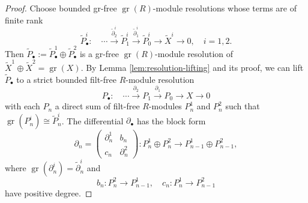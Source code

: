 \documentclass[11pt,a4paper]{article} %
\def\gr{\operatorname{gr}}
\begin{document}
\begin{proof}
Choose bounded gr-free $\gr(R)$-module resolutions whose terms are of finite rank
\[
\widetilde{P}^i_\bullet:
\quad
\cdots\xrightarrow{\widetilde{\partial}^i_2}
\widetilde{P}^i_1
\xrightarrow{\widetilde{\partial}^i_1}
\widetilde{P}^i_0
\longrightarrow
\widetilde{X}^i
\longrightarrow 0,\quad i=1,2.
\]
Then $\widetilde{P}_\bullet:= \widetilde{P}^1_\bullet\oplus\widetilde{P}^2_\bullet$ is a gr-free $\gr(R)$-module resolution of $\widetilde{X}^1\oplus\widetilde{X}^2
= \gr(X)$. By Lemma \ref{lem:resolution-lifting} and its proof, we can lift $\widetilde{P}_\bullet$ to a strict bounded filt-free $R$-module resolution
\[
P_\bullet:
\quad
\cdots
\xrightarrow{\partial_2}
P_1
\xrightarrow{\partial_1}
P_0
\longrightarrow
X
\longrightarrow 0
\]
with each $P_n$ a direct sum of filt-free $R$-modules $P^1_n$ and $P^2_n$ such that $\gr(P^i_n)\cong \widetilde{P}^i_n$. The differential $\partial_{\bullet}$ has the block form
\[
    \partial_n=
    \begin{pmatrix}
        \partial^1_n & b_n\\
        c_n & \partial^2_n
    \end{pmatrix}
    :
    P^1_n\oplus P^2_n
    \longrightarrow
    P^1_{n-1}\oplus P^2_{n-1},
\]
where $\gr(\partial^i_n)=\widetilde{\partial}^i_n$ and 
\[
b_n: P^2_n\longrightarrow P^1_{n-1},\quad c_n: P^1_n\longrightarrow P^2_{n-1}
\]
have positive degree.


\end{proof}
\end{document}
